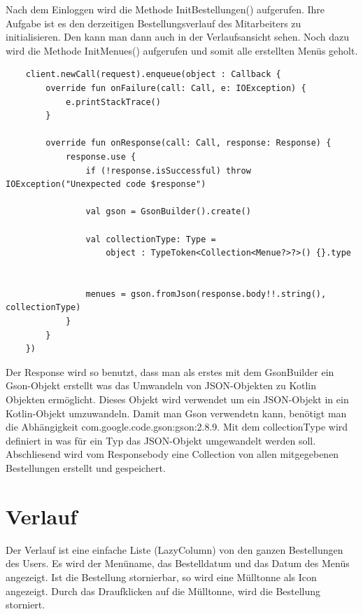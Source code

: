 Nach dem Einloggen wird die Methode InitBestellungen() aufgerufen. Ihre Aufgabe ist es den derzeitigen Bestellungsverlauf des Mitarbeiters zu initialisieren.
Den kann man dann auch in der Verlaufsansicht sehen. Noch dazu wird die Methode InitMenues() aufgerufen und somit alle erstellten Menüs geholt.


\begin{lstlisting}
    client.newCall(request).enqueue(object : Callback {
        override fun onFailure(call: Call, e: IOException) {
            e.printStackTrace()
        }

        override fun onResponse(call: Call, response: Response) {
            response.use {
                if (!response.isSuccessful) throw IOException("Unexpected code $response")

                val gson = GsonBuilder().create()

                val collectionType: Type =
                    object : TypeToken<Collection<Menue?>?>() {}.type


                menues = gson.fromJson(response.body!!.string(), collectionType)
            }
        }
    })
\end{lstlisting}


Der Response wird so benutzt, dass man als erstes mit dem GsonBuilder ein Gson-Objekt erstellt
 was das Umwandeln von JSON-Objekten zu Kotlin Objekten ermöglicht. 
Dieses Objekt wird verwendet um ein JSON-Objekt in ein Kotlin-Objekt umzuwandeln. 
Damit man Gson verwendetn kann, benötigt man die Abhängigkeit com.google.code.gson:gson:2.8.9.
Mit dem collectionType wird definiert in was für ein Typ das JSON-Objekt umgewandelt werden soll.
Abschliesend wird vom Responsebody eine Collection von allen mitgegebenen Bestellungen erstellt und gespeichert.


\pagebreak

\section{Verlauf}

Der Verlauf ist eine einfache Liste (LazyColumn) von den ganzen Bestellungen des Users.
Es wird der Menüname, das Bestelldatum und das Datum des Menüs angezeigt.
Ist die Bestellung stornierbar, so wird eine Mülltonne als Icon angezeigt. 
Durch das Draufklicken auf die Mülltonne, wird die Bestellung storniert.

